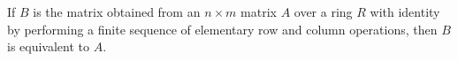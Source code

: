 If $B$ is the matrix obtained from an $n \times m$ matrix $A$ over a ring $R$ with identity by performing a finite sequence of elementary row and column operations, then $B$ is equivalent to $A$.
